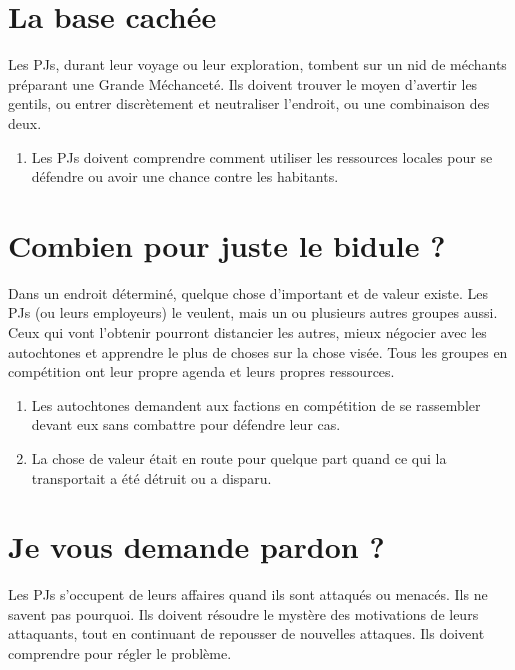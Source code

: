 \begin{multicols}{2}
\section{La base cachée}
\hypertarget{base}{}


Les PJs, durant leur voyage ou leur exploration, tombent sur un nid de méchants préparant une Grande Méchanceté. Ils doivent trouver le moyen d'avertir les gentils, ou entrer discrètement et neutraliser l'endroit, ou une combinaison des deux.

\themes
\begin{enumerate}
\item Les PJs doivent comprendre comment utiliser les ressources locales pour se défendre ou avoir une chance contre les habitants.
\end{enumerate}

\section{Combien pour juste le bidule ?}
\hypertarget{bidule}{}


Dans un endroit déterminé, quelque chose d'important et de valeur existe. Les PJs (ou leurs employeurs) le veulent, mais un ou plusieurs autres groupes aussi. Ceux qui vont l'obtenir pourront distancier les autres, mieux négocier avec les autochtones et apprendre le plus de choses sur la chose visée. Tous les groupes en compétition ont leur propre agenda et leurs propres ressources.

\themes
\begin{enumerate}
\item Les autochtones demandent aux factions en compétition de se rassembler devant eux sans combattre pour défendre leur cas.
\item La chose de valeur était en route pour quelque part quand ce qui la transportait a été détruit ou a disparu.
\end{enumerate}

\section{Je vous demande pardon ?}
\hypertarget{pardon}{}


Les PJs s'occupent de leurs affaires quand ils sont attaqués ou menacés. Ils ne savent pas pourquoi. Ils doivent résoudre le mystère des motivations de leurs attaquants, tout en continuant de repousser de nouvelles attaques. Ils doivent comprendre pour régler le problème.


\end{multicols}
